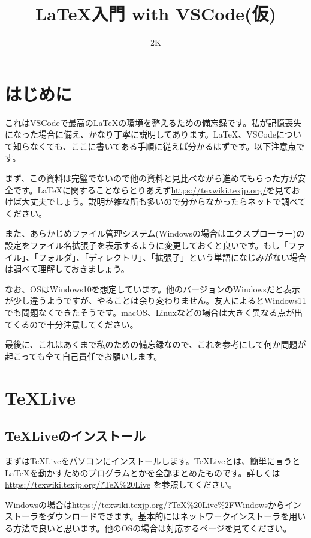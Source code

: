 

\title{\LaTeX 入門 with VSCode(仮)}
\author{2K}


\maketitle

\section{はじめに}
これはVSCodeで最高の\LaTeX の環境を整えるための備忘録です。私が記憶喪失になった場合に備え、かなり丁寧に説明してあります。LaTeX、VSCodeについて知らなくても、ここに書いてある手順に従えば分かるはずです。以下注意点です。

まず、この資料は完璧でないので他の資料と見比べながら進めてもらった方が安全です。\LaTeX に関することならとりあえず\url{https://texwiki.texjp.org/}を見ておけば大丈夫でしょう。説明が雑な所も多いので分からなかったらネットで調べてください。

また、あらかじめファイル管理システム(Windowsの場合はエクスプローラー)の設定をファイル名拡張子を表示するように変更しておくと良いです。もし「ファイル」、「フォルダ」、「ディレクトリ」、「拡張子」という単語になじみがない場合は調べて理解しておきましょう。

なお、OSはWindows10を想定しています。他のバージョンのWindowsだと表示が少し違うようですが、やることは余り変わりません。友人によるとWindows11でも問題なくできたそうです。macOS、Linuxなどの場合は大きく異なる点が出てくるので十分注意してください。

最後に、これはあくまで私のための備忘録なので、これを参考にして何か問題が起こっても全て自己責任でお願いします。

\section{\TeX Live}
\subsection{\TeX Liveのインストール}
まずは\TeX Liveをパソコンにインストールします。\TeX Liveとは、簡単に言うと\LaTeX を動かすためのプログラムとかを全部まとめたものです。詳しくは \url{https://texwiki.texjp.org/?TeX%20Live} を参照してください。

Windowsの場合は\url{https://texwiki.texjp.org/?TeX%20Live%2FWindows}からインストーラをダウンロードできます。基本的にはネットワークインストーラを用いる方法で良いと思います。他のOSの場合は対応するページを見てください。

